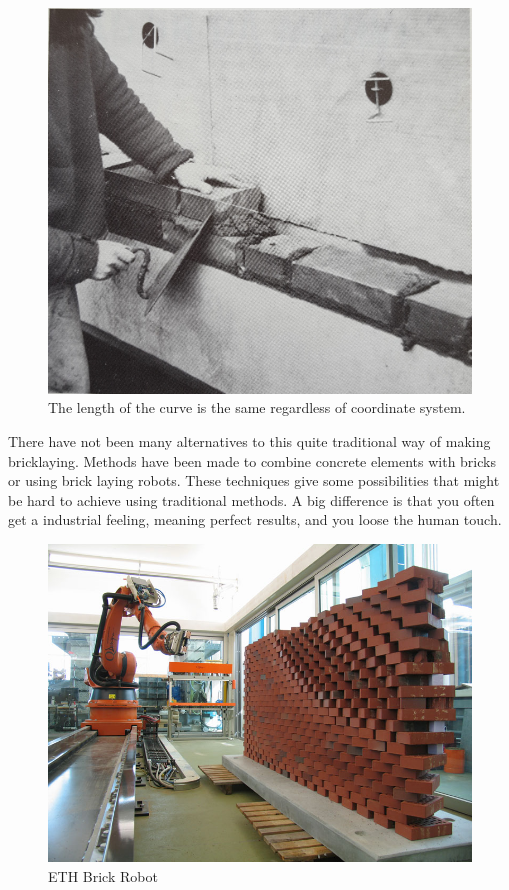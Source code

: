 \begin{figure}[H]
\centering
\includegraphics[width=0.8\linewidth ]{figure/Theory/brickLay.jpg}
\caption{The length of the curve is the same regardless of coordinate system.}
\end{figure}

There have not been many alternatives to this quite traditional way of making bricklaying. Methods have been made to combine concrete elements with bricks or using brick laying robots. These techniques give some possibilities that might be hard to achieve using traditional methods. A big difference is that you often get a industrial feeling, meaning perfect results, and you loose the human touch.

\begin{figure}[H]
\centering
\includegraphics[width=0.9\linewidth ]{figure/Introduction/RobotBrick.jpg}
\caption{ETH Brick Robot}
\end{figure}




